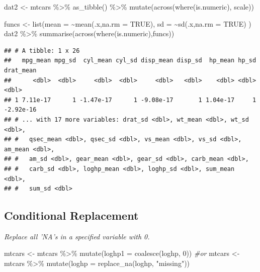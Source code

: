 \documentclass[
]{article}
\newenvironment{Shaded}{\begin{snugshade}}{\end{snugshade}}
\newcommand{\AttributeTok}[1]{\textcolor[rgb]{0.77,0.63,0.00}{#1}}
\newcommand{\CommentTok}[1]{\textcolor[rgb]{0.56,0.35,0.01}{\textit{#1}}}
\newcommand{\ConstantTok}[1]{\textcolor[rgb]{0.00,0.00,0.00}{#1}}
\newcommand{\DecValTok}[1]{\textcolor[rgb]{0.00,0.00,0.81}{#1}}
\newcommand{\FunctionTok}[1]{\textcolor[rgb]{0.00,0.00,0.00}{#1}}
\newcommand{\NormalTok}[1]{#1}
\newcommand{\OtherTok}[1]{\textcolor[rgb]{0.56,0.35,0.01}{#1}}
\newcommand{\SpecialCharTok}[1]{\textcolor[rgb]{0.00,0.00,0.00}{#1}}
\newcommand{\StringTok}[1]{\textcolor[rgb]{0.31,0.60,0.02}{#1}}
\begin{document}
\begin{Shaded}
\begin{Highlighting}[]
\NormalTok{dat2 }\OtherTok{\textless{}{-}}\NormalTok{ mtcars }\SpecialCharTok{\%\textgreater{}\%}
    \FunctionTok{as\_tibble}\NormalTok{() }\SpecialCharTok{\%\textgreater{}\%}
    \FunctionTok{mutate}\NormalTok{(}\FunctionTok{across}\NormalTok{(}\FunctionTok{where}\NormalTok{(is.numeric), scale))}

\NormalTok{funcs }\OtherTok{\textless{}{-}} \FunctionTok{list}\NormalTok{(}\AttributeTok{mean =} \SpecialCharTok{\textasciitilde{}}\FunctionTok{mean}\NormalTok{(.x,}\AttributeTok{na.rm =} \ConstantTok{TRUE}\NormalTok{), }
  \AttributeTok{sd =} \SpecialCharTok{\textasciitilde{}}\FunctionTok{sd}\NormalTok{(.x,}\AttributeTok{na.rm =} \ConstantTok{TRUE}\NormalTok{)}
\NormalTok{)}
\NormalTok{dat2 }\SpecialCharTok{\%\textgreater{}\%} \FunctionTok{summarise}\NormalTok{(}\FunctionTok{across}\NormalTok{(}\FunctionTok{where}\NormalTok{(is.numeric),funcs))}
\end{Highlighting}
\end{Shaded}

\begin{verbatim}
## # A tibble: 1 x 26
##   mpg_mean mpg_sd  cyl_mean cyl_sd disp_mean disp_sd  hp_mean hp_sd drat_mean
##      <dbl>  <dbl>     <dbl>  <dbl>     <dbl>   <dbl>    <dbl> <dbl>     <dbl>
## 1 7.11e-17      1 -1.47e-17      1 -9.08e-17       1 1.04e-17     1 -2.92e-16
## # ... with 17 more variables: drat_sd <dbl>, wt_mean <dbl>, wt_sd <dbl>,
## #   qsec_mean <dbl>, qsec_sd <dbl>, vs_mean <dbl>, vs_sd <dbl>, am_mean <dbl>,
## #   am_sd <dbl>, gear_mean <dbl>, gear_sd <dbl>, carb_mean <dbl>,
## #   carb_sd <dbl>, loghp_mean <dbl>, loghp_sd <dbl>, sum_mean <dbl>,
## #   sum_sd <dbl>
\end{verbatim}

\hypertarget{conditional-replacement}{%
\subsection{Conditional Replacement}\label{conditional-replacement}}

\emph{Replace all 'NA's in a specified variable with 0.}

\begin{Shaded}
\begin{Highlighting}[]
\NormalTok{mtcars }\OtherTok{\textless{}{-}}\NormalTok{ mtcars }\SpecialCharTok{\%\textgreater{}\%} \FunctionTok{mutate}\NormalTok{(}\AttributeTok{loghp1 =} \FunctionTok{coalesce}\NormalTok{(loghp, }\DecValTok{0}\NormalTok{))}
\CommentTok{\#or}
\NormalTok{mtcars }\OtherTok{\textless{}{-}}\NormalTok{ mtcars }\SpecialCharTok{\%\textgreater{}\%} \FunctionTok{mutate}\NormalTok{(}\AttributeTok{loghp =} \FunctionTok{replace\_na}\NormalTok{(loghp, }\StringTok{"missing"}\NormalTok{))}
\end{Highlighting}
\end{Shaded}
\end{document}
